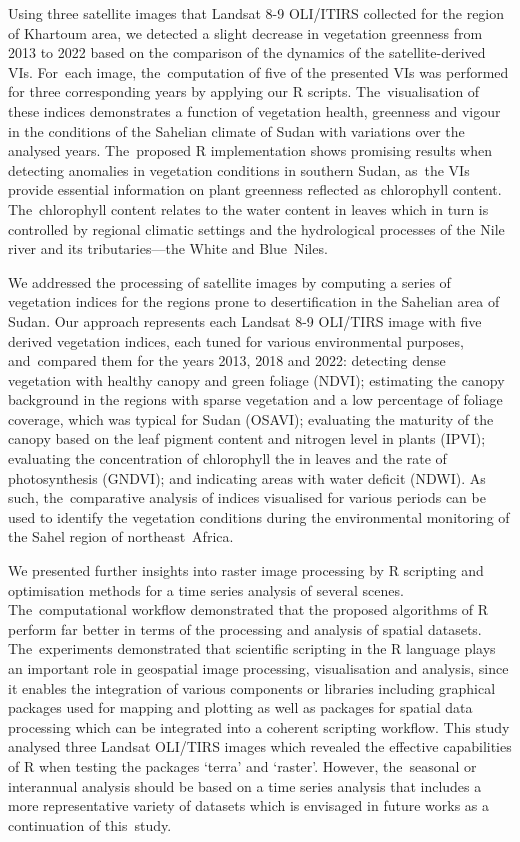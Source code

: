 \documentclass[jimaging,article,accept,pdftex,moreauthors]{Definitions/mdpi}
\begin{document}
Using three satellite images that Landsat 8-9 OLI/ITIRS collected for the region of Khartoum area, we detected a slight decrease in vegetation greenness from 2013 to 2022 based on the comparison of the dynamics of the satellite-derived VIs. For~each image, the~computation of five of the presented VIs was performed for three corresponding years by applying our R scripts. The~visualisation of these indices demonstrates a function of vegetation health, greenness and vigour in the conditions of the Sahelian climate of Sudan with variations over the analysed years. The~proposed R implementation shows promising results when detecting anomalies in vegetation conditions in southern Sudan, as~the VIs provide essential information on plant greenness reflected as chlorophyll content. The~chlorophyll content relates to the water content in leaves which in turn is controlled by regional climatic settings and the hydrological processes of the Nile river and its tributaries---the White and Blue~Niles. 

We addressed the processing of satellite images by computing a series of vegetation indices for the regions prone to desertification in the Sahelian area of Sudan. Our approach represents each Landsat 8-9 OLI/TIRS image with five derived vegetation indices, each tuned for various environmental purposes, and~compared them for the years 2013, 2018 and 2022: detecting dense vegetation with healthy canopy and green foliage (NDVI); estimating the canopy background in the regions with sparse vegetation and a low percentage of foliage coverage, which was typical for Sudan (OSAVI); evaluating the maturity of the canopy based on the leaf pigment content and nitrogen level in plants (IPVI); evaluating the concentration of chlorophyll the in leaves and the rate of photosynthesis (GNDVI); and indicating areas with water deficit (NDWI). As such, the~comparative analysis of indices visualised for various periods can be used to identify the vegetation conditions during the environmental monitoring of the Sahel region of northeast~Africa.

We presented further insights into raster image processing by R scripting and optimisation methods for a time series analysis of several scenes. The~computational workflow demonstrated that the proposed algorithms of R perform far better in terms of the processing and analysis of spatial datasets. The~experiments demonstrated that scientific scripting in the R language plays an important role in geospatial image processing, visualisation and analysis, since it enables the integration of various components or libraries including graphical packages used for mapping and plotting as well as packages for spatial data processing which can be integrated into a coherent scripting workflow. This study analysed three Landsat OLI/TIRS images which revealed the effective capabilities of R when testing the packages `terra' and `raster'. However, the~seasonal or interannual analysis should be based on a time series analysis that includes a more representative variety of datasets which is envisaged in future works as a continuation of this~study.
\end{document}
